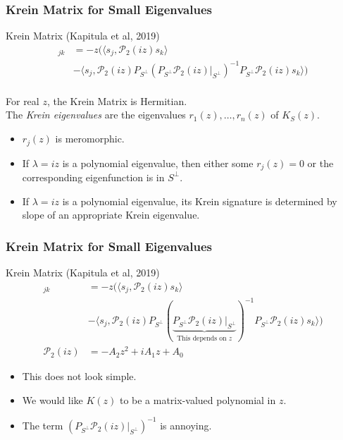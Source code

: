 \documentclass[16pt]{beamer}
\newcommand{\calP}{\mathcal{P}}
\begin{document}
\begin{frame}
\frametitle{Krein Matrix for Small Eigenvalues}
	\begin{block}{Krein Matrix (Kapitula et al, 2019)}
	\begin{align*}
        [K_S(z)]_{jk} &= -z \Big( 
        \langle s_j , \calP_2(iz)s_k\rangle \\
        &- \langle s_j , \calP_2(iz) P_{S^{\perp}} (P_{S^{\perp}} \calP_2(iz)|_{S^{\perp}} )^{-1} P_{S^{\perp}} \calP_2(iz) s_k \rangle \Big)  \\
    \end{align*}
    \end{block}
    For real $z$, the Krein Matrix is Hermitian.\\
    \vspace{1ex} 
    The \emph{Krein eigenvalues} are the eigenvalues $r_1(z), \dots, r_n(z)$ of $K_S(z)$.
    \begin{itemize}
      \item $r_j(z)$ is meromorphic.
      \item If $\lambda = iz$ is a polynomial eigenvalue, then 
      either some $r_j(z) = 0$ or the corresponding eigenfunction is in $S^\perp$.
      \item If $\lambda = iz$ is a polynomial eigenvalue, its Krein signature is determined by slope of an appropriate Krein eigenvalue.
    \end{itemize}

\end{frame}

\begin{frame}
\frametitle{Krein Matrix for Small Eigenvalues}
	\begin{block}{Krein Matrix (Kapitula et al, 2019)}
	\begin{align*}
        [K_S(z)]_{jk} &= -z \Big( 
        \langle s_j , \calP_2(iz)s_k\rangle \\
        &- \langle s_j , \calP_2(iz) P_{S^{\perp}} (\underbrace{P_{S^{\perp}} \calP_2(iz)|_{S^{\perp}} }_{\text{This depends on }z})^{-1} P_{S^{\perp}} \calP_2(iz) s_k \rangle \Big) \\
        \calP_2(iz) &= -A_2 z^2 + i A_1 z + A_0
    \end{align*}
    \end{block}

    \begin{itemize}
    \item<1-> This does not look simple.
    \item<2-> We would like $K(z)$ to be a matrix-valued polynomial in $z$.
    \item<3-> The term $(P_{S^{\perp}} \calP_2(iz)|_{S^{\perp}})^{-1}$ is annoying.
	\end{itemize}
\end{frame}
\end{document}
